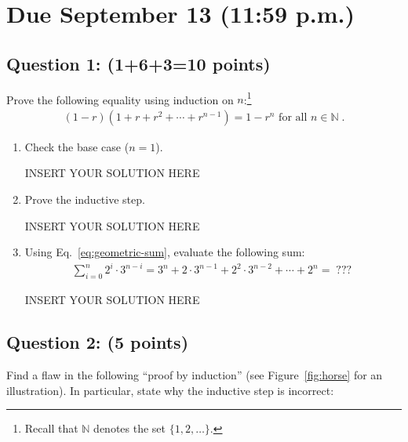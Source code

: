 \runningheadrule
\firstpageheadrule
\cfoot{}

\section*{Due September 13 (11:59 p.m.)}
\intro


\subsection*{Question 1: (1+6+3=10 points)}
Prove the following equality using induction on $n$:\footnote{Recall that $\mathbb{N}$ denotes the set $\{1,2,\ldots\}$.}
    \begin{align}
    (1-r)(1+r+r^2+ \cdots +r^{n-1}) = 1-r^n \text{ for all } n \in \mathbb{N}\;. \label{eq:geometric-sum}
    \end{align}
\begin{enumerate}
    \item Check the base case ($n=1$).
\begin{solution}   INSERT YOUR SOLUTION HERE   \end{solution}
    
    \item Prove the inductive step.
\begin{solution}   INSERT YOUR SOLUTION HERE   \end{solution}
    
    \item Using Eq.~\eqref{eq:geometric-sum}, evaluate the following sum:
    \begin{align*}
        \sum_{i = 0}^n 2^i \cdot 3^{n-i}
        =
        3^n + 2\cdot 3^{n-1} + 2^2 \cdot 3^{n-2} + \cdots + 2^n =\; ???\;
    \end{align*}
    
\begin{solution}   INSERT YOUR SOLUTION HERE   \end{solution}
\end{enumerate}




\subsection*{Question 2: (5 points)}
Find a flaw in the following ``proof by induction'' (see Figure~\ref{fig:horse} for an illustration). In particular, state why the inductive step is incorrect:
\vspace{0.5cm}

